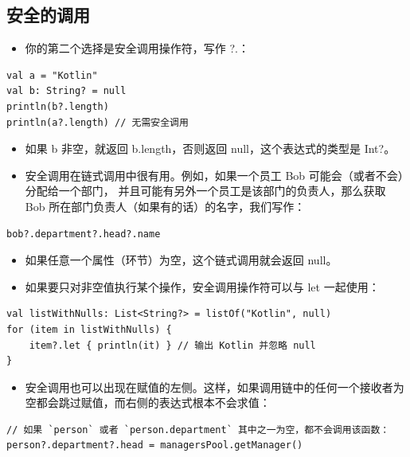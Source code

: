 \documentclass[9pt, b5paper]{article}
\begin{document}
\subsection{安全的调用}
\label{sec-1-3}
\begin{itemize}
\item 你的第二个选择是安全调用操作符，写作 ?.：
\end{itemize}
\begin{verbatim}
val a = "Kotlin"
val b: String? = null
println(b?.length)
println(a?.length) // 无需安全调用
\end{verbatim}
\begin{itemize}
\item 如果 b 非空，就返回 b.length，否则返回 null，这个表达式的类型是 Int?。
\item 安全调用在链式调用中很有用。例如，如果一个员工 Bob 可能会（或者不会）分配给一个部门， 并且可能有另外一个员工是该部门的负责人，那么获取 Bob 所在部门负责人（如果有的话）的名字，我们写作：
\end{itemize}
\begin{verbatim}
bob?.department?.head?.name
\end{verbatim}
\begin{itemize}
\item 如果任意一个属性（环节）为空，这个链式调用就会返回 null。
\item 如果要只对非空值执行某个操作，安全调用操作符可以与 let 一起使用：
\end{itemize}
\begin{verbatim}
val listWithNulls: List<String?> = listOf("Kotlin", null)
for (item in listWithNulls) {
    item?.let { println(it) } // 输出 Kotlin 并忽略 null
}
\end{verbatim}
\begin{itemize}
\item 安全调用也可以出现在赋值的左侧。这样，如果调用链中的任何一个接收者为空都会跳过赋值，而右侧的表达式根本不会求值：
\end{itemize}
\begin{verbatim}
// 如果 `person` 或者 `person.department` 其中之一为空，都不会调用该函数：
person?.department?.head = managersPool.getManager()
\end{verbatim}
\end{document}
